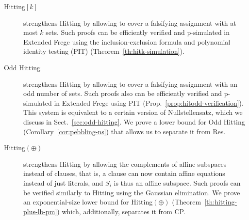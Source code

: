 \documentclass[11pt]{article}
\newcommand{\scterm}[1]{{\textrm{\sc #1}}}
\newcommand{\hit}{\scterm{Hitting}}
\newcommand{\res}{\scterm{Res}}
\newcommand{\F}{\scterm{Frege}}
\newcommand{\EF}{\scterm{Extended {\F}}}
\newcommand{\cp}{\scterm{CP}}
\newcommand{\hitp}{{\hit}$(\oplus)$}
\newcommand{\hitodd}{\scterm{Odd} {\hit}}
\newcommand{\hitk}[1]{\hit$[#1]$}
\numberwithin{equation}{section}
\begin{document}
\begin{description}
\item[{\hitk{k}}] strengthens {\hit} by allowing to cover a falsifying assignment
with at most $k$ sets. Such proofs can be efficiently verified and p-simulated in
{\EF} using the inclusion-exclusion formula and polynomial identity testing (PIT) (Theorem~\ref{th:hitk-simulation}).
\item[{\hitodd}] strengthens {\hit} by allowing to cover a falsifying assignment
with an odd number of sets. Such proofs also can be efficiently verified 
and p-simulated in {\EF} using PIT (Prop.~\ref{prop:hitodd-verification}).
This system is equivalent to a certain version of Nullstellensatz,
which we discuss in Sect.~\ref{sec:odd-hitting}. 
We prove a lower bound for {\hitodd} (Corollary~\ref{cor:pebbling-ns})
that allows us to separate it from {\res}.
\item[{\hitp}] strengthens {\hit} by allowing the complements of affine subspaces
instead of clauses, that is, a clause can now contain affine equations instead of just literals, 
and $S_i$ is thus an affine subspace. Such proofs can be verified similarly
to {\hit} using the Gaussian elimination. We prove an exponential-size lower bound for {\hitp}
(Theorem~\ref{th:hitting-plus-lb-pm}) which, additionally, separates it from {\cp}. %
\end{description}
\end{document}
